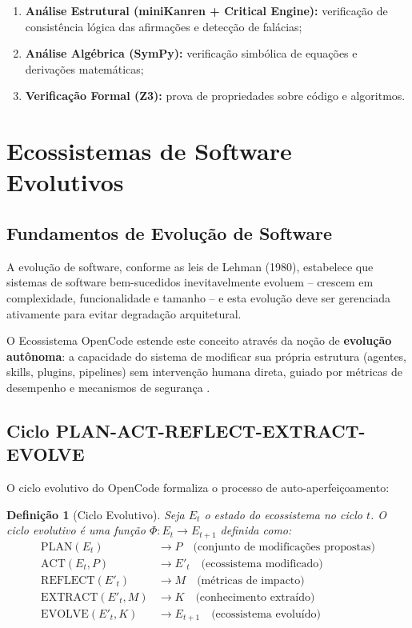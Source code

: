 \documentclass[12pt,a4paper,sumario=tradicional]{abntex2}
\newtheorem{definition}{Definição}[chapter]
\begin{document}
\begin{enumerate}[leftmargin=*]
    \item \textbf{Análise Estrutural (miniKanren + Critical Engine):} verificação de consistência lógica das afirmações e detecção de falácias;
    \item \textbf{Análise Algébrica (SymPy):} verificação simbólica de equações e derivações matemáticas;
    \item \textbf{Verificação Formal (Z3):} prova de propriedades sobre código e algoritmos.
\end{enumerate}

\section{Ecossistemas de Software Evolutivos}

\subsection{Fundamentos de Evolução de Software}

A evolução de software, conforme as leis de Lehman (1980), estabelece que sistemas de software bem-sucedidos inevitavelmente evoluem -- crescem em complexidade, funcionalidade e tamanho -- e esta evolução deve ser gerenciada ativamente para evitar degradação arquitetural.

O Ecossistema OpenCode estende este conceito através da noção de \textbf{evolução autônoma}: a capacidade do sistema de modificar sua própria estrutura (agentes, skills, plugins, pipelines) sem intervenção humana direta, guiado por métricas de desempenho e mecanismos de segurança \cite{kodumagulla2026engineering}.

\subsection{Ciclo PLAN-ACT-REFLECT-EXTRACT-EVOLVE}

O ciclo evolutivo do OpenCode formaliza o processo de auto-aperfeiçoamento:

\begin{definition}[Ciclo Evolutivo]
Seja $E_t$ o estado do ecossistema no ciclo $t$. O ciclo evolutivo é uma função $\Phi: E_t \rightarrow E_{t+1}$ definida como:
\begin{align}
    \text{PLAN}(E_t) &\rightarrow P \quad \text{(conjunto de modificações propostas)} \\
    \text{ACT}(E_t, P) &\rightarrow E'_t \quad \text{(ecossistema modificado)} \\
    \text{REFLECT}(E'_t) &\rightarrow M \quad \text{(métricas de impacto)} \\
    \text{EXTRACT}(E'_t, M) &\rightarrow K \quad \text{(conhecimento extraído)} \\
    \text{EVOLVE}(E'_t, K) &\rightarrow E_{t+1} \quad \text{(ecossistema evoluído)}
\end{align}
\end{definition}
\end{document}
